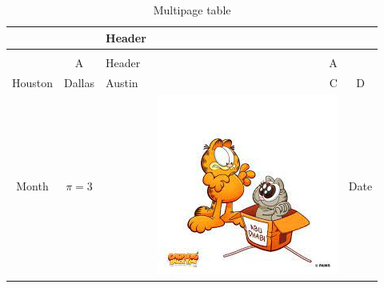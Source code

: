 \documentclass{article}
\theoremstyle{definition}
\theoremstyle{remark}
\begin{document}
\begin{longtable}{|c c|l|r|c|}
\caption{Multipage table}\label{tab:3}    
\\
& & Header & & \\
\hline
\endfirsthead
\\
& A & Header & A & \\
\hline
\endhead
\hline
Houston & Dallas & Austin & C & D \\
\hline \hline
Month & $\pi=3$ &  & \includegraphics[width=0.2\linewidth]{download.jpg} & Date \\

\end{longtable}
\end{document}
